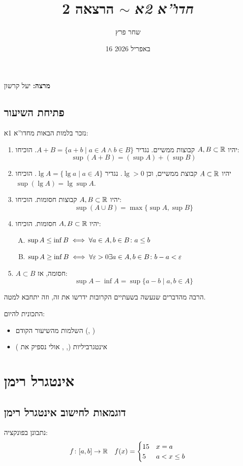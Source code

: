 \documentclass[]{../../../../tex/classes/styledArticle}
\author{שחר פרץ}
\title{\textit{חדו''א 2א} $\sim$ הרצאה 2}
\date{16 באפריל 2026}
\begin{document}
	\maketitle
	\textbf{מרצה: }יעל קרשון
	
	\subsection*{פתיחת השיעור}
	נזכר בלמות הבאות מחדו''א 1א: 
	\begin{Exercise}
		\begin{enumerate}
			\item יהיו $A, B \subset \mathbb{R}$ קבוצות ממשיים. נגדיר $A + B = \{a + b \mid a\in A \land b \in B\}$. הוכיחו: 
			\[ \sup (A + B) = (\sup A) + (\sup B) \]
			\item יהיו $A \subset \mathbb{R}$ קבוצת ממשיים, וכן $\lg > 0$. נגדיר $\lg A = \{ \lg a \mid a \in A\}$. הוכיחו $\sup(\lg A) = \lg \sup A$. 
			\item יהיו $A, B \subset \mathbb{R}$ קבוצות חסומות. הוכיחו: 
			\[ \sup (A \cup B) = \max\{\sup A, \sup B\} \]
			\item יהיו $A, B \subset \mathbb{R}$ חסומות. הוכיחו: 
			\begin{enumerate}[A.]
				\item \hfil $\sup A \le \inf B \iff \forall a \in A, b \in B\colon a \le b$
				\item \hfil $\sup A \ge \inf B \iff \forall \eg > 0 \exists a \in A, b \in B \co b - a < \eg$
			\end{enumerate}
			\item $A \subset B$ חסומה, אז: 
			\[ \sup A - \inf A = \sup\{a - b \mid a, b \in A\} \]
		\end{enumerate}
	\end{Exercise}
	הרבה מהדברים שנעשה בשעתיים הקרובות ידרשו את זה, וזה יתחבא למטה. 
	
	התכונית להיום: 
	\begin{itemize}
		\item השלמות מהשיעור הקודם (, )
		\item אינטגרביליות (, , אולי נספיק את )
	\end{itemize}
	
	\section{אינטגרל רימן}
	\subsection{דוגמאות לחישוב אינטגרל רימן}
	נתבונן בפונקציה: 
	\begin{align*}
		f \colon [a, b] \to \mathbb{R} && f(x) = \begin{cases}
			15 & x = a \\
			5 & a < x \le b
		\end{cases}
	\end{align*}
	
\end{document}
